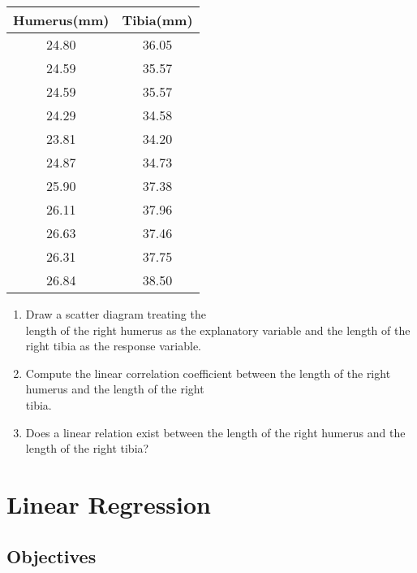 \documentclass[11pt]{book}\usepackage[]{graphicx}\usepackage[]{color}
\begin{document}
\begin{exercises}
\begin{exercise}
\begin{table}[ht]
\begin{center}
\begin{tabular}{@{} c c @{}}
		Humerus(mm) & Tibia(mm) \\ \hline
		24.80 & 36.05 \\
		24.59 & 35.57 \\
		24.59 & 35.57 \\
		24.29 & 34.58 \\
		23.81 & 34.20 \\
		24.87 & 34.73 \\
		25.90 & 37.38 \\
		26.11 & 37.96 \\
		26.63 & 37.46 \\
		26.31 & 37.75 \\
		26.84 & 38.50 \\ \hline
		\end{tabular}
		\end{center}
	\end{table}
	
\begin{enumerate}
\item Draw a scatter diagram treating the \\ length of the right humerus as the explanatory variable and the length of the right tibia as the response variable.

\item Compute the linear correlation coefficient between the length of the right \\ humerus and the length of the right \\ tibia. 

\item Does a linear relation exist between the length of the right humerus and the \\ length of the right tibia?
\end{enumerate}

\end{exercise}
\begin{solution}


\end{solution}


\end{exercises}

\onecolumn



\chapter{Linear Regression}
\label{chap:ch16}

\section{Objectives}
\end{document}
